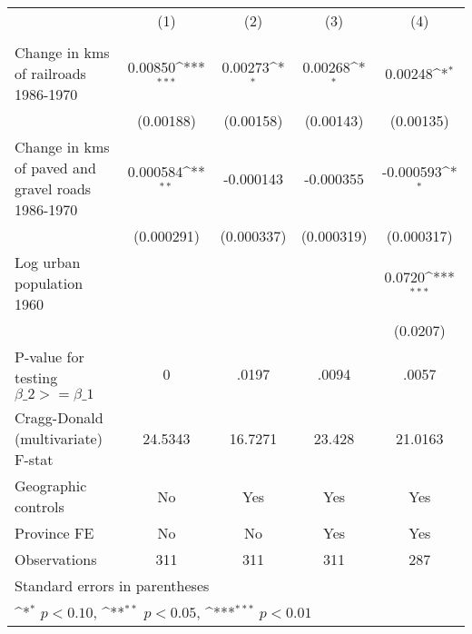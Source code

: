 {
\def\sym#1{\ifmmode^{#1}\else\(^{#1}\)\fi}
\begin{tabular}{l*{4}{c}}
\hline\hline
                &\multicolumn{1}{c}{(1)}&\multicolumn{1}{c}{(2)}&\multicolumn{1}{c}{(3)}&\multicolumn{1}{c}{(4)}\\
                &\multicolumn{1}{c}{}&\multicolumn{1}{c}{}&\multicolumn{1}{c}{}&\multicolumn{1}{c}{}\\
\hline
Change in kms of railroads 1986-1970&  0.00850\sym{***}&  0.00273\sym{*}  &  0.00268\sym{*}  &  0.00248\sym{*}  \\
                &(0.00188)         &(0.00158)         &(0.00143)         &(0.00135)         \\
[1em]
Change in kms of paved and gravel roads 1986-1970& 0.000584\sym{**} &-0.000143         &-0.000355         &-0.000593\sym{*}  \\
                &(0.000291)         &(0.000337)         &(0.000319)         &(0.000317)         \\
[1em]
Log urban population 1960&                  &                  &                  &   0.0720\sym{***}\\
                &                  &                  &                  & (0.0207)         \\
\hline
P-value for testing $\beta\_{2} >= \beta\_{1}$&        0         &    .0197         &    .0094         &    .0057         \\
Cragg-Donald (multivariate) F-stat&  24.5343         &  16.7271         &   23.428         &  21.0163         \\
Geographic controls&       No         &      Yes         &      Yes         &      Yes         \\
Province FE     &       No         &       No         &      Yes         &      Yes         \\
Observations    &      311         &      311         &      311         &      287         \\
\hline\hline
\multicolumn{5}{l}{\footnotesize Standard errors in parentheses}\\
\multicolumn{5}{l}{\footnotesize \sym{*} \(p<0.10\), \sym{**} \(p<0.05\), \sym{***} \(p<0.01\)}\\
\end{tabular}
}

